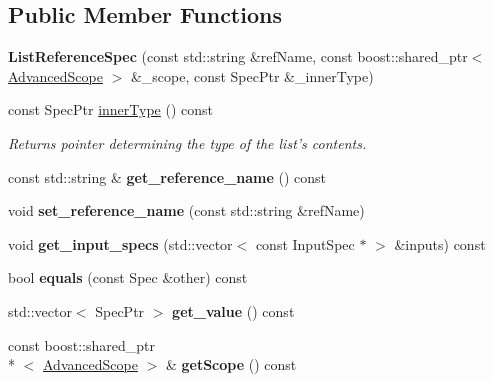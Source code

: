 \subsection*{Public Member Functions}
\begin{DoxyCompactItemize}
\item 
\hypertarget{classgiskard__suturo_1_1ListReferenceSpec_aae66215922b554ca789d9c773483413c}{{\bfseries List\-Reference\-Spec} (const std\-::string \&ref\-Name, const boost\-::shared\-\_\-ptr$<$ \hyperlink{classgiskard__suturo_1_1AdvancedScope}{Advanced\-Scope} $>$ \&\-\_\-scope, const Spec\-Ptr \&\-\_\-inner\-Type)}\label{classgiskard__suturo_1_1ListReferenceSpec_aae66215922b554ca789d9c773483413c}

\item 
const Spec\-Ptr \hyperlink{classgiskard__suturo_1_1ListReferenceSpec_a6f7600a285633f7ef19c0a13f0236ae6}{inner\-Type} () const 
\begin{DoxyCompactList}\small\item\em Returns pointer determining the type of the list's contents. \end{DoxyCompactList}\item 
\hypertarget{classgiskard__suturo_1_1ListReferenceSpec_a172fc228b1113d0d1ed33acc5ac35863}{const std\-::string \& {\bfseries get\-\_\-reference\-\_\-name} () const }\label{classgiskard__suturo_1_1ListReferenceSpec_a172fc228b1113d0d1ed33acc5ac35863}

\item 
\hypertarget{classgiskard__suturo_1_1ListReferenceSpec_a386521c134951201eefd91714aab63bf}{void {\bfseries set\-\_\-reference\-\_\-name} (const std\-::string \&ref\-Name)}\label{classgiskard__suturo_1_1ListReferenceSpec_a386521c134951201eefd91714aab63bf}

\item 
\hypertarget{classgiskard__suturo_1_1ListReferenceSpec_addbdde137c2005fb0555b900d856bc02}{void {\bfseries get\-\_\-input\-\_\-specs} (std\-::vector$<$ const Input\-Spec $\ast$ $>$ \&inputs) const }\label{classgiskard__suturo_1_1ListReferenceSpec_addbdde137c2005fb0555b900d856bc02}

\item 
\hypertarget{classgiskard__suturo_1_1ListReferenceSpec_a1b13096cfe83dc628d833b9e0cc752ba}{bool {\bfseries equals} (const Spec \&other) const }\label{classgiskard__suturo_1_1ListReferenceSpec_a1b13096cfe83dc628d833b9e0cc752ba}

\item 
\hypertarget{classgiskard__suturo_1_1ListReferenceSpec_a2a46f259dc474644b4c732d59d3c360a}{std\-::vector$<$ Spec\-Ptr $>$ {\bfseries get\-\_\-value} () const }\label{classgiskard__suturo_1_1ListReferenceSpec_a2a46f259dc474644b4c732d59d3c360a}

\item 
\hypertarget{classgiskard__suturo_1_1ListReferenceSpec_ac5bdd2941128d57c97bbbaa2956db3d0}{const boost\-::shared\-\_\-ptr\\*
$<$ \hyperlink{classgiskard__suturo_1_1AdvancedScope}{Advanced\-Scope} $>$ \& {\bfseries get\-Scope} () const }\label{classgiskard__suturo_1_1ListReferenceSpec_ac5bdd2941128d57c97bbbaa2956db3d0}

\end{DoxyCompactItemize}
